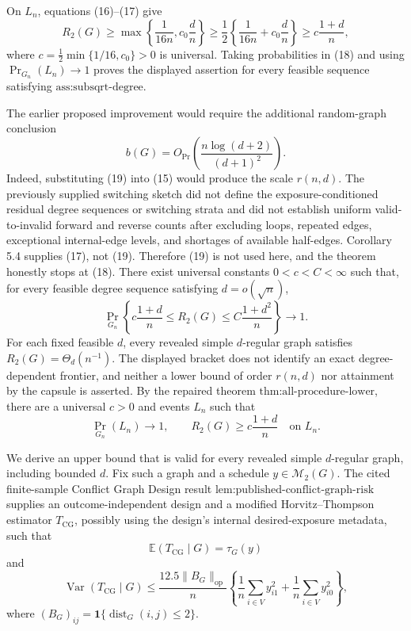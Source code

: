 On \(L_n\), equations (16)--(17) give
\[
R_2(G)\ge
\max\!\left\{\frac1{16n},c_0\frac d n\right\}
\ge \frac12\left\{\frac1{16n}+c_0\frac d n\right\}
\ge c\frac{1+d}{n}, \tag{18}
\]
where \(c=\tfrac12\min\{1/16,c_0\}>0\) is universal.  Taking probabilities in (18) and using \(\Pr_{G_n}(L_n)\to1\) proves the displayed assertion for every feasible sequence satisfying \(\text{ass:subsqrt-degree}\).

The earlier proposed improvement would require the additional random-graph conclusion
\[
b(G)=O_{\Pr}\!\left(\frac{n\log(d+2)}{(d+1)^2}\right). \tag{19}
\]
Indeed, substituting (19) into (15) would produce the scale \(r(n,d)\).  The previously supplied switching sketch did not define the exposure-conditioned residual degree sequences or switching strata and did not establish uniform valid-to-invalid forward and reverse counts after excluding loops, repeated edges, exceptional internal-edge levels, and shortages of available half-edges.  Corollary 5.4 supplies (17), not (19).  Therefore (19) is not used here, and the theorem honestly stops at (18).
There exist universal constants \(0<c<C<\infty\) such that, for every feasible degree sequence satisfying \(d=o(\sqrt n)\),
\[
\Pr_{G_n}\!\left\{
c\frac{1+d}{n}
\le R_2(G)\le C\frac{1+d^2}{n}
\right\}\longrightarrow1.
\]
For each fixed feasible \(d\), every revealed simple \(d\)-regular graph satisfies \(R_2(G)=\Theta_d(n^{-1})\).  The displayed bracket does not identify an exact degree-dependent frontier, and neither a lower bound of order \(r(n,d)\) nor attainment by the capsule is asserted.
By the repaired theorem \(\text{thm:all-procedure-lower}\), there are a universal \(c>0\) and events \(L_n\) such that
\[
\Pr_{G_n}(L_n)\longrightarrow1,
\qquad
R_2(G)\ge c\frac{1+d}{n}\quad\text{on }L_n. \tag{20}
\]

We derive an upper bound that is valid for every revealed simple \(d\)-regular graph, including bounded \(d\).  Fix such a graph and a schedule \(y\in\mathcal M_2(G)\).  The cited finite-sample Conflict Graph Design result \(\text{lem:published-conflict-graph-risk}\) supplies an outcome-independent design and a modified Horvitz--Thompson estimator \(T_{\mathrm{CG}}\), possibly using the design's internal desired-exposure metadata, such that
\[
\mathbb E(T_{\mathrm{CG}}\mid G)=\tau_G(y) \tag{21}
\]
and
\[
\operatorname{Var}(T_{\mathrm{CG}}\mid G)
\le \frac{12.5\|B_G\|_{\mathrm{op}}}{n}
\left\{\frac1n\sum_{i\in V}y_{i1}^2+
\frac1n\sum_{i\in V}y_{i0}^2\right\}, \tag{22}
\]
where \((B_G)_{ij}=\mathbf1\{\operatorname{dist}_G(i,j)\le2\}\).


